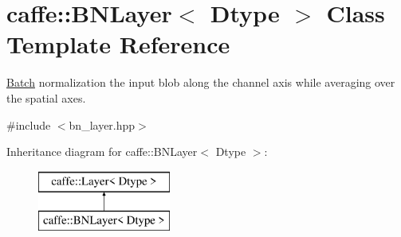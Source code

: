 \hypertarget{classcaffe_1_1BNLayer}{}\section{caffe\+:\+:B\+N\+Layer$<$ Dtype $>$ Class Template Reference}
\label{classcaffe_1_1BNLayer}


\hyperlink{classcaffe_1_1Batch}{Batch} normalization the input blob along the channel axis while averaging over the spatial axes.  




{\ttfamily \#include $<$bn\+\_\+layer.\+hpp$>$}

Inheritance diagram for caffe\+:\+:B\+N\+Layer$<$ Dtype $>$\+:\begin{figure}[H]
\begin{center}
\leavevmode
\includegraphics[height=2.000000cm]{classcaffe_1_1BNLayer}
\end{center}
\end{figure}

